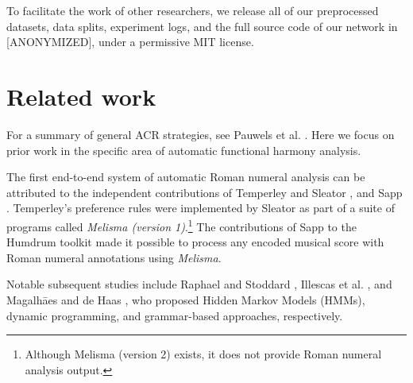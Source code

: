 \documentclass{article}
\newcommand{\guide}[1]{}
\begin{document}
To facilitate the work of other researchers, we release all of our preprocessed datasets, data splits, experiment logs, and the full source code of our network in [ANONYMIZED], under a permissive MIT license.


\section{Related work}

\guide{Chord recognition task.}
For a summary of general ACR strategies, see Pauwels et al. \cite{pauwels_20_2019}. 
Here we focus on prior work  in the specific area of automatic functional harmony analysis.



\guide{First end-to-end system.}
The first end-to-end system of automatic Roman numeral analysis can be attributed to the independent contributions of Temperley and Sleator \cite{temperley2004cognition}, and Sapp \cite{sapp2009tsroot}.
Temperley's preference rules were implemented by Sleator as part of a suite of programs called \emph{Melisma (version 1)}.\footnote{Although Melisma (version 2) exists, it does not provide Roman numeral analysis output.} 
The contributions of Sapp to the Humdrum toolkit \cite{huron2002music} made it possible to process any encoded musical score with Roman numeral annotations using \emph{Melisma}.

\guide{Before deep learning.}
Notable subsequent studies include Raphael and Stoddard \cite{raphael2004functional}, Illescas et al. \cite{illescas2007harmonic}, and Magalh\=aes and de Haas \cite{magalhaes2011functional}, who proposed Hidden Markov Models (HMMs), dynamic programming, and grammar-based approaches, respectively. 
\end{document}
